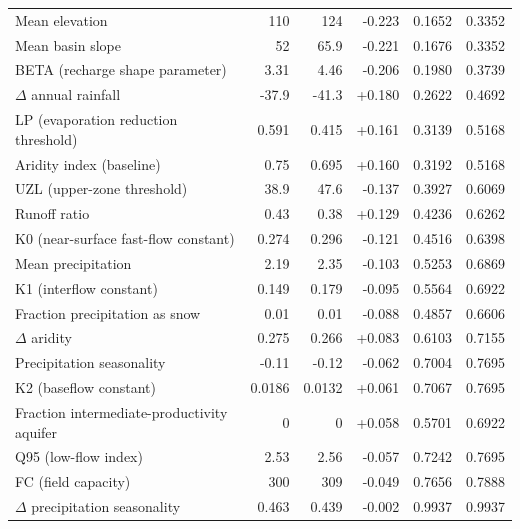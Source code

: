 \begin{center}
\begin{longtable}{p{5.2cm} r r r r r}
Mean elevation & 110 & 124 & -0.223 & 0.1652 & 0.3352 \\
Mean basin slope & 52 & 65.9 & -0.221 & 0.1676 & 0.3352 \\
BETA (recharge shape parameter) & 3.31 & 4.46 & -0.206 & 0.1980 & 0.3739 \\
$\Delta$ annual rainfall & -37.9 & -41.3 & +0.180 & 0.2622 & 0.4692 \\
LP (evaporation reduction threshold) & 0.591 & 0.415 & +0.161 & 0.3139 & 0.5168 \\
Aridity index (baseline) & 0.75 & 0.695 & +0.160 & 0.3192 & 0.5168 \\
UZL (upper-zone threshold) & 38.9 & 47.6 & -0.137 & 0.3927 & 0.6069 \\
Runoff ratio & 0.43 & 0.38 & +0.129 & 0.4236 & 0.6262 \\
K0 (near-surface fast-flow constant) & 0.274 & 0.296 & -0.121 & 0.4516 & 0.6398 \\
Mean precipitation & 2.19 & 2.35 & -0.103 & 0.5253 & 0.6869 \\
K1 (interflow constant) & 0.149 & 0.179 & -0.095 & 0.5564 & 0.6922 \\
Fraction precipitation as snow & 0.01 & 0.01 & -0.088 & 0.4857 & 0.6606 \\
$\Delta$ aridity & 0.275 & 0.266 & +0.083 & 0.6103 & 0.7155 \\
Precipitation seasonality & -0.11 & -0.12 & -0.062 & 0.7004 & 0.7695 \\
K2 (baseflow constant) & 0.0186 & 0.0132 & +0.061 & 0.7067 & 0.7695 \\
Fraction intermediate-productivity aquifer & 0 & 0 & +0.058 & 0.5701 & 0.6922 \\
Q95 (low-flow index) & 2.53 & 2.56 & -0.057 & 0.7242 & 0.7695 \\
FC (field capacity) & 300 & 309 & -0.049 & 0.7656 & 0.7888 \\
$\Delta$ precipitation seasonality & 0.463 & 0.439 & -0.002 & 0.9937 & 0.9937 \\
\hline
\end{longtable}
\end{center}
